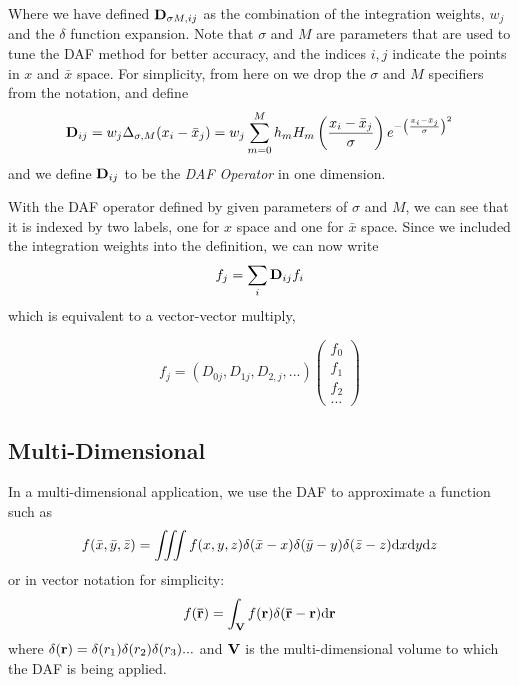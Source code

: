 \documentclass[preprint]{revtex4}
\begin{document}
Where we have defined ${\bf D}_{\sigma M, ij}$ as the combination of the integration weights, $w_j$ and 
the $\delta$ function expansion. 
Note that $\sigma$ and $M$ are parameters that are used to tune the DAF method for 
better accuracy, and the indices $i,j$ indicate the points in $x$ and $\bar{x}$ space. 
For simplicity, from here on we drop the $\sigma$ and $M$ specifiers from the notation, 
and define
\begin{equation}
\label{eqn_DAF_def0}
{\bf D}_{ij} = w_j \Delta_{\sigma,M}(x_i-\bar{x}_j) = w_j \sum_{m=0}^M h_m H_m \left(\frac{x_i-\bar{x}_j}{\sigma}\right)e^{- \left(\frac{x_i-\bar{x}_j}{\sigma}\right)^2}
\end{equation}
and we define ${\bf D}_{ij}$ to be the {\it DAF Operator} in one dimension. 

With the DAF operator defined by given parameters of $\sigma$ and $M$, we can see that it 
is indexed by two labels, one for $x$ space and one for $\bar{x}$ space. Since we 
included the integration weights into the definition, we can now write
\begin{equation}
f_j = \sum_i {\bf D}_{ij} f_i
\end{equation}
which is equivalent to a vector-vector multiply, 

\begin{equation}
f_j = \left(D_{0j}, D_{1j}, D_{2,j}, ...\right)
\begin{pmatrix}
f_0\\
f_1\\
f_2\\
...
\end{pmatrix}
\end{equation}


\subsection{Multi-Dimensional}

In a multi-dimensional application, we use the DAF to approximate a function such as
\begin{equation}
f(\bar{x},\bar{y},\bar{z}) = \iiint f(x,y,z)\delta(\bar{x}-x)\delta(\bar{y}-y)\delta(\bar{z}-z) {\rm d}x {\rm d}y {\rm d}z
\end{equation}
or in vector notation for simplicity: 
\begin{equation}
f({\bf \bar{r}}) = \int_{\bf V} f({\bf r})\delta({\bf \bar{r}}-{\bf r}){\rm d}{\bf r}
\end{equation}
where $\delta({\bf r}) = \delta(r_1)\delta(r_2)\delta(r_3)...$ and ${\bf V}$ is the
multi-dimensional volume to which the DAF is being applied. 
\end{document}
